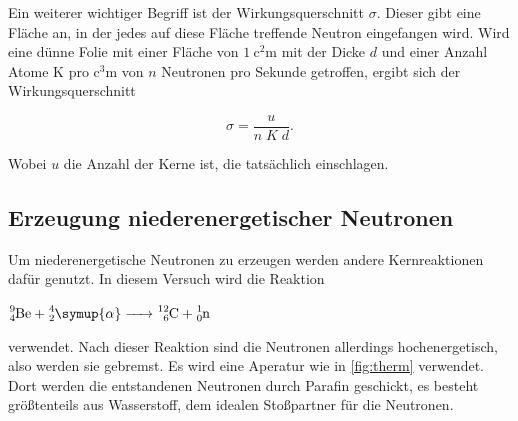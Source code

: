 Ein weiterer wichtiger Begriff ist der Wirkungsquerschnitt $\sigma$. 
Dieser gibt eine Fläche an, in der jedes auf diese Fläche treffende Neutron eingefangen wird.
Wird eine dünne Folie mit einer Fläche von $\SI{1}{\square\centi\metre}$ mit der Dicke $d$ und einer Anzahl Atome K pro $\si{\cubic\centi\metre}$ von $n$ Neutronen pro Sekunde getroffen, ergibt sich der Wirkungsquerschnitt 


\begin{equation}
    \sigma = \frac{u}{n \; K\; d}.
    \label{eq:sigma}
\end{equation}

Wobei $u$ die Anzahl der Kerne ist, die tatsächlich einschlagen.
%
%



\subsection{Erzeugung niederenergetischer Neutronen}
\label{ssec:t3}

Um niederenergetische Neutronen zu erzeugen werden andere Kernreaktionen dafür genutzt.
In diesem Versuch wird die Reaktion 

$\ce{^{9}_{4}Be + ^{4}_{2}\symup{\alpha} -> ^{12}_{6}C + ^{1}_0n}$

verwendet.
Nach dieser Reaktion sind die Neutronen allerdings hochenergetisch, also werden sie gebremst.
Es wird eine Aperatur wie in \autoref{fig:therm} verwendet.
Dort werden die entstandenen Neutronen durch Parafin geschickt, es besteht größtenteils aus Wasserstoff, dem idealen Stoßpartner für die Neutronen.

